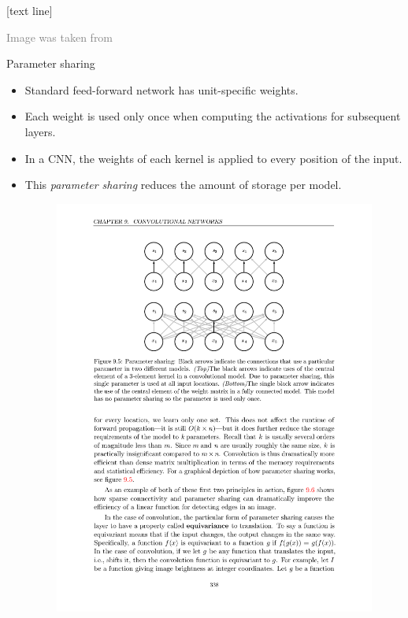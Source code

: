 \documentclass{beamer}
\newcommand{\referencefootnote}[1]{\setbeamertemplate{footline}[text line]{%
\parbox{0.9\paperwidth}{\vspace*{-23pt}\tiny{\textcolor{gray}{#1}}\hfill\scriptsize\insertframenumber}}}
\begin{document}
{ \referencefootnote{Image was taken from \cite{goodfellow2016deep}}
	\begin{frame}{Parameter sharing}
	\footnotesize
	\begin{itemize}
		\item Standard feed-forward network has unit-specific weights. %
		\item Each weight is used only once when computing the activations for subsequent layers. %
		\item In a CNN, the weights of each kernel is applied to every position of the input. %
		\item This \emph{parameter sharing} reduces the amount of storage per model.
		\begin{figure}
					\center
					\includegraphics[scale=.4]{figures/dl9_5.pdf} 
					\end{figure}
	\end{itemize}
	\end{frame}
	}
\end{document}
